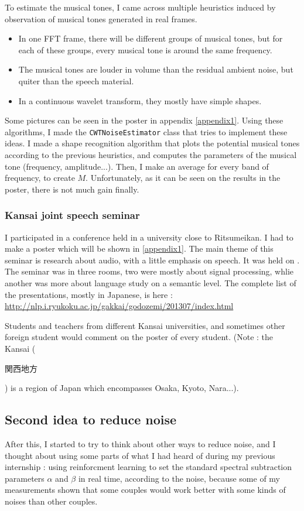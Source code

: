 To estimate the musical tones, I came across multiple heuristics induced by observation of musical tones generated in real frames.

\begin{itemize}
\item In one FFT frame, there will be different groups of musical tones, but for each of these groups, every musical tone is around the same frequency.
\item The musical tones are louder in volume than the residual ambient noise, but quiter than the speech material.
\item In a continuous wavelet transform, they mostly have simple shapes.
\end{itemize}
Some pictures can be seen in the poster in appendix \ref{appendix1}.
Using these algorithms, I made the \texttt{CWTNoiseEstimator} class that tries to implement these ideas. I made a shape recognition algorithm that plots the potential musical tones according to the previous heuristics, and computes the parameters of the musical tone (frequency, amplitude...). Then, I make an average for every band of frequency, to create $M$. Unfortunately, as it can be seen on the results in the poster, there is not much gain finally.
\subsubsection{Kansai joint speech seminar}
I participated in a conference held in a university close to Ritsumeikan. I had to make a poster which will be shown in \ref{appendix1}.
The main theme of this seminar is research about audio, with a little emphasis on speech. It was held on . The seminar was in three rooms, two were mostly about signal processing, whlie another was more about language study on a semantic level. The complete list of the presentations, mostly in Japanese, is here : \url{http://nlp.i.ryukoku.ac.jp/gakkai/godozemi/201307/index.html}

Students and teachers from different Kansai universities, and sometimes other foreign student would comment on the poster of every student.
(Note : the Kansai (\begin{CJK}{UTF8}{min}関西地方\end{CJK}) is a region of Japan which encompasses Osaka, Kyoto, Nara...).

\subsection{Second idea to reduce noise}
After this, I started to try to think about other ways to reduce noise, and I thought about using some parts of what I had heard of during my previous internship : using reinforcment learning to set the standard spectral subtraction parameters $\alpha$ and $\beta$ in real time, according to the noise, because some of my measurements shown that some couples would work better with some kinds of noises than other couples.

